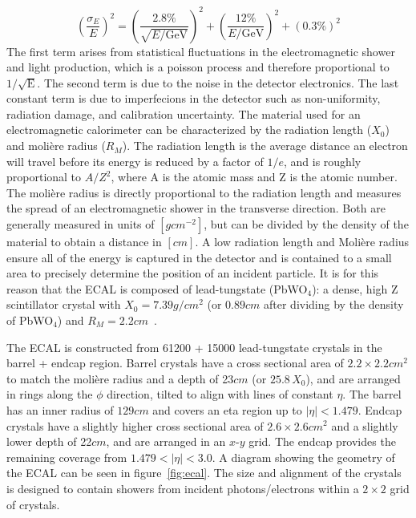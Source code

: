 \begin{equation}
	\left(\frac{\sigma_E}{E}\right)^2=\left(\frac{2.8\%}{\sqrt{E/\mathrm{GeV}}}\right)^2+\left(\frac{12\%}{E/\mathrm{GeV}}\right)^2+(0.3\%)^2
\end{equation}
The first term arises from statistical fluctuations in the electromagnetic shower and light production, which is a poisson process and therefore proportional to $1/\sqrt{\mathrm{E}}$. The second term is due to the noise in the detector electronics. The last constant term is due to imperfecions in the detector such as non-uniformity, radiation damage, and calibration uncertainty.
The material used for an electromagnetic calorimeter can be characterized by the radiation length ($X_0$) and moli\`ere radius ($R_M$). The radiation length is the average distance an electron will travel before its energy is reduced by a factor of $1/e$, and is roughly proportional to $A/Z^2$, where A is the atomic mass and Z is the atomic number. The moli\`ere radius is directly proportional to the radiation length and measures the spread of an electromagnetic shower in the transverse direction. Both are generally measured in units of $\left[\si{g}\unit{cm^{-2}}\right]$, but can be divided by the density of the material to obtain a distance in $\left[\si{cm}\right]$. A low radiation length and Moli\`ere radius ensure all of the energy is captured in the detector and is contained to a small area to precisely determine the position of an incident particle. It is for this reason that the ECAL is composed of lead-tungstate (PbWO$_4$): a dense, high Z scintillator crystal with $X_0=7.39\unit{g/cm^2}$ (or $0.89\unit{cm}$ after dividing by the density of PbWO$_4$) and $R_M=2.2\unit{cm}$~\cite{Workman:2022ynf}.

The ECAL is constructed from 61200 + 15000 lead-tungstate crystals in the barrel + endcap region. Barrel crystals have a cross sectional area of $2.2\times2.2\unit{cm^2}$ to match the moli\`ere radius and a depth of 23$\unit{cm}$ (or $25.8\,X_0$), and are arranged in rings along the $\phi$ direction, tilted to align with lines of constant $\eta$. The barrel has an inner radius of $129\unit{cm}$ and covers an eta region up to $\left|\eta\right|<1.479$. Endcap crystals have a slightly higher cross sectional area of $2.6\times2.6\unit{cm^2}$ and a slightly lower depth of 22$\unit{cm}$, and are arranged in an $x$-$y$ grid. The endcap provides the remaining coverage from $1.479<\left|\eta\right|<3.0$. A diagram showing the geometry of the ECAL can be seen in figure~\ref{fig:ecal}. The size and alignment of the crystals is designed to contain showers from incident photons/electrons within a $2\times2$ grid of crystals.

